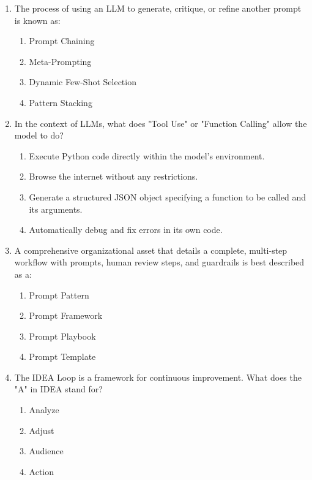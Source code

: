 \documentclass{article}
\begin{document}
\begin{enumerate}
    \item The process of using an LLM to generate, critique, or refine another prompt is known as:
    \begin{enumerate}
        \item Prompt Chaining
        \item Meta-Prompting
        \item Dynamic Few-Shot Selection
        \item Pattern Stacking
    \end{enumerate}

    \item In the context of LLMs, what does "Tool Use" or "Function Calling" allow the model to do?
    \begin{enumerate}
        \item Execute Python code directly within the model's environment.
        \item Browse the internet without any restrictions.
        \item Generate a structured JSON object specifying a function to be called and its arguments.
        \item Automatically debug and fix errors in its own code.
    \end{enumerate}

    \item A comprehensive organizational asset that details a complete, multi-step workflow with prompts, human review steps, and guardrails is best described as a:
    \begin{enumerate}
        \item Prompt Pattern
        \item Prompt Framework
        \item Prompt Playbook
        \item Prompt Template
    \end{enumerate}

    \item The IDEA Loop is a framework for continuous improvement. What does the "A" in IDEA stand for?
    \begin{enumerate}
        \item Analyze
        \item Adjust
        \item Audience
        \item Action
    \end{enumerate}

\end{enumerate}
\end{document}
